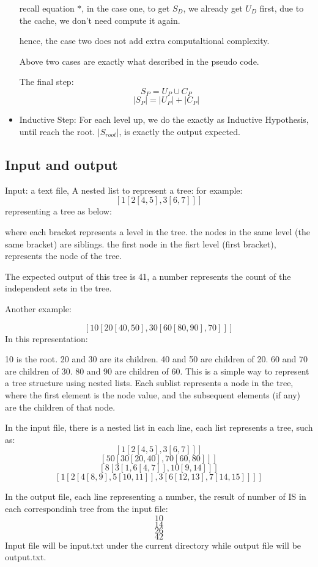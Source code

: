 \documentclass{article}
\begin{document}
\begin{itemize}
    recall equation $*$, in the case one, to get $S_{D}$, we already get $U_{D}$ first, due to the cache, we don't need compute it again. 

    hence, the case two does not add extra computaltional complexity.

    Above two cases are exactly what described in the pseudo code.
    
    The final step:
    \[ S_{P} =  U_{P} \cup C_{P} \] 
    \[ |S_{P}| =  |U_{P}| + |C_{P}| \] 



  \item Inductive Step: For each level up, we do the exactly as Inductive Hypothesis, until reach the root. $|S_{root}|$, is exactly the output expected.

  \end{itemize}


\subsection*{Input and output}
Input: a text file, 
A nested list to represent a tree:
for example:
\[ [1 [2 [4, 5], 3 [6, 7]] ] \]
representing a tree as below:



where each bracket represents a level in the tree. the nodes in the same level (the same bracket) are siblings.
the first node in the fisrt level (first bracket), represents the node of the tree.

The expected output of this tree is 41, a number represents the count of the independent sets in the tree. 


Another example:

\[ [10 [20 [40, 50], 30 [60 [80, 90], 70]]] \]
In this representation:

10 is the root.
20 and 30 are its children.
40 and 50 are children of 20.
60 and 70 are children of 30.
80 and 90 are children of 60.
This is a simple way to represent a tree structure using nested lists. Each sublist represents a node in the tree, where the first element is the node value, and the subsequent elements (if any) are the children of that node. 

In the input file, there is a nested list in each line, each list represents a tree, such as:
\[ [1 [2 [4, 5], 3 [6, 7]]]\]
\[[50 [30 [20, 40], 70 [60, 80]]]\]
\[[8 [3 [1, 6 [4, 7]], 10 [9, 14]]]\]
\[[1 [2 [4 [8, 9], 5 [10, 11]], 3 [6 [12, 13], 7 [14, 15]]]]\]

In the output file, each line representing a number, the result of number of IS in each correspondinh tree from the input file:
\[10\]
\[14\]
\[26\]
\[42\]
Input file will be input.txt under the current directory while output file will be output.txt.
\end{document}
